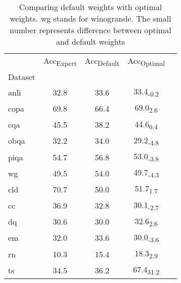 \begin{table}[h]
\centering
\caption{Comparing default weights with optimal weights. wg stands for winogrande. The small number represents difference between optimal and default weights}
\label{tab:cd_weights}
\begin{tabular}{lcccc}
 & Acc\textsubscript{Expert} & Acc\textsubscript{Default} & Acc\textsubscript{Optimal} \\
Dataset &  &  &  \\
anli & 32.8 & 33.6 & 33.4\textsubscript{-0.2} \\
copa & 69.8 & 66.4 & 69.0\textsubscript{2.6} \\
cqa & 45.5 & 38.2 & 44.6\textsubscript{6.4} \\
obqa & 32.2 & 34.0 & 29.2\textsubscript{-4.8} \\
piqa & 54.7 & 56.8 & 53.0\textsubscript{-3.8} \\
wg & 49.5 & 54.0 & 49.7\textsubscript{-4.3} \\
cld & 70.7 & 50.0 & 51.7\textsubscript{1.7} \\
cc & 36.9 & 32.8 & 30.1\textsubscript{-2.7} \\
dq & 30.6 & 30.0 & 32.6\textsubscript{2.6} \\
em & 32.0 & 33.6 & 30.0\textsubscript{-3.6} \\
rn & 10.3 & 15.4 & 18.3\textsubscript{2.9} \\
ts & 34.5 & 36.2 & 67.4\textsubscript{31.2} \\
\end{tabular}
\end{table}
